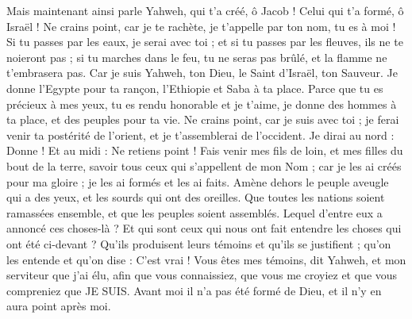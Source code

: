 \begin{multicols}{2}
\VerseOne{}Mais maintenant ainsi parle Yahweh, qui t'a créé, ô Jacob ! Celui qui t'a formé, ô Israël ! Ne crains point, car je te rachète, je t'appelle par ton nom, tu es à moi !
Si tu passes par les eaux, je serai avec toi ; et si tu passes par les fleuves, ils ne te noieront pas ; si tu marches dans le feu, tu ne seras pas brûlé, et la flamme ne t'embrasera pas.
Car je suis Yahweh, ton Dieu, le Saint d'Israël, ton Sauveur. Je donne l'Egypte pour ta rançon, l'Ethiopie et Saba à ta place.
Parce que tu es précieux à mes yeux, tu es rendu honorable et je t'aime, je donne des hommes à ta place, et des peuples pour ta vie.
Ne crains point, car je suis avec toi ; je ferai venir ta postérité de l'orient, et je t'assemblerai de l'occident.
Je dirai au nord : Donne ! Et au midi : Ne retiens point ! Fais venir mes fils de loin, et mes filles du bout de la terre,
savoir tous ceux qui s'appellent de mon Nom ; car je les ai créés pour ma gloire ; je les ai formés et les ai faits.
Amène dehors le peuple aveugle qui a des yeux, et les sourds qui ont des oreilles.
Que toutes les nations soient ramassées ensemble, et que les peuples soient assemblés. Lequel d'entre eux a annoncé ces choses-là ? Et qui sont ceux qui nous ont fait entendre les choses qui ont été ci-devant ? Qu'ils produisent leurs témoins et qu'ils se justifient ; qu'on les entende et qu'on dise : C'est vrai !
Vous êtes mes témoins, dit Yahweh, et mon serviteur que j'ai élu, afin que vous connaissiez, que vous me croyiez et que vous compreniez que JE SUIS. Avant moi il n'a pas été formé de Dieu, et il n'y en aura point après moi.

\end{multicols}

